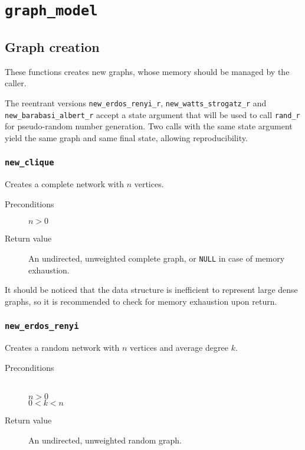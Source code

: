 \section{\texttt{graph\_model}}

\subsection{Graph creation}

These functions creates new graphs, whose memory should be managed by the caller.

The reentrant versions \texttt{new\_erdos\_renyi\_r}, 
\texttt{new\_watts\_strogatz\_r} and \texttt{new\_barabasi\_albert\_r} accept 
a state argument that will be used to call \texttt{rand\_r} for pseudo-random 
number generation. 
Two calls with the same state argument yield the same graph and same final
state, allowing reproducibility.

\subsubsection{\texttt{new\_clique}}

Creates a complete network with $n$ vertices.

\begin{description}
 \item[Preconditions] $n > 0$
 \item[Return value] An undirected, unweighted complete graph, or \texttt{NULL}
 in case of memory exhaustion.
\end{description}

It should be noticed that the data structure is inefficient to represent
large dense graphs, so it is recommended to check for memory exhaustion upon
return.

\subsubsection{\texttt{new\_erdos\_renyi}}

Creates a random network with $n$ vertices and average degree $k$.

\begin{description}
 \item[Preconditions] ~\\
   $n > 0$ \\
   $0 < k < n$
 \item[Return value] An undirected, unweighted random graph.
\end{description}

